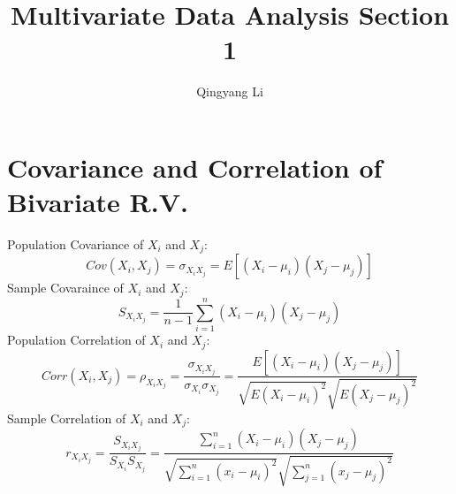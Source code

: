 \documentclass{article}
\title{Multivariate Data Analysis Section 1}
\author{Qingyang Li}
\date{}
\begin{document}
\maketitle

\section{Covariance and Correlation of Bivariate R.V.}
Population Covariance of $X_i$ and $X_j$: 
\[Cov(X_i,X_j)=\sigma_{X_{i}X_{j}}= E[(X_i-\mu_i)(X_j-\mu_j)]\]
Sample Covaraince of $X_i$ and $X_j$:
\[S_{X_{i}X_{j}} = \frac{1}{n-1}\sum_{i=1}^n(X_i-\mu_i)(X_j-\mu_j)\]
Population Correlation of $X_i$ and $X_j$: 
\[Corr(X_i,X_j)=\rho_{X_{i}X_{j}}=\frac{\sigma_{X_{i}X_{j}}}{\sigma_{X_i}\sigma_{X_j}}=\frac{E[(X_i-\mu_i)(X_j-\mu_j)]}{\sqrt{E(X_i-\mu_i)^2}\sqrt{E(X_j-\mu_j)^2}}\]
Sample Correlation of $X_i$ and $X_j$: 
\[r_{X_{i}X_{j}}=\frac{S_{X_{i}X_{j}}}{S_{X_i}S_{X_j}}=\frac{\sum_{i=1}^n(X_i-\mu_i)(X_j-\mu_j)}{\sqrt{\sum_{i=1}^n(x_i-\mu_i)^2}\sqrt{\sum_{j=1}^n(x_j-\mu_j)^2}}\]
\end{document}
